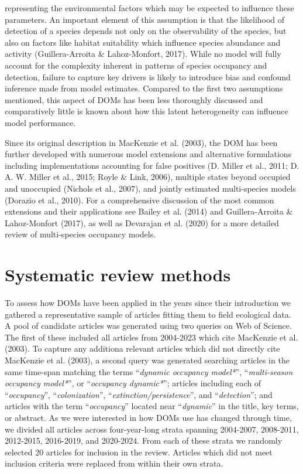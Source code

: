 \documentclass[
]{article}
\begin{document}
\begin{enumerate}
  representing the environmental factors which may be expected to
  influence these parameters. An important element of this assumption is
  that the likelihood of detection of a species depends not only on the
  observability of the species, but also on factors like habitat
  suitability which influence species abundance and activity
  (Guillera-Arroita \& Lahoz-Monfort, 2017). While no model will fully
  account for the complexity inherent in patterns of species occupancy
  and detection, failure to capture key drivers is likely to introduce
  bias and confound inference made from model estimates. Compared to the
  first two assumptions mentioned, this aspect of DOMs has been less
  thoroughly discussed and comparatively little is known about how this
  latent heterogeneity can influence model performance.
\end{enumerate}

Since its original description in MacKenzie et al. (2003), the DOM has
been further developed with numerous model extensions and alternative
formulations including implementations accounting for false positives
(D. Miller et al., 2011; D. A. W. Miller et al., 2015; Royle \& Link,
2006), multiple states beyond occupied and unoccupied (Nichols et al.,
2007), and jointly estimated multi-species models (Dorazio et al.,
2010). For a comprehensive discussion of the most common extensions and
their applications see Bailey et al. (2014) and Guillera-Arroita \&
Lahoz-Monfort (2017), as well as Devarajan et al. (2020) for a more
detailed review of multi-species occupancy models.

\section{Systematic review methods}\label{systematic-review-methods}

To assess how DOMs have been applied in the years since their
introduction we gathered a representative sample of articles fitting
them to field ecological data. A pool of candidate articles was
generated using two queries on Web of Science. The first of these
included all articles from 2004-2023 which cite MacKenzie et al. (2003).
To capture any additiona relevant articles which did not directly cite
MacKenzie et al. (2003), a second query was generated searching articles
in the same time-span matching the terms ``\emph{dynamic occupancy
model*}'', ``\emph{multi-season occupancy model*}'', or
``\emph{occupancy dynamic*}''; articles including each of
``\emph{occupancy}'', ``\emph{colonization}'',
``\emph{extinction/persistence}'', and ``\emph{detection}''; and
articles with the term ``\emph{occupancy}'' located near
``\emph{dynamic}'' in the title, key terms, or abstract. As we were
interested in how DOMs use has changed through time, we divided all
articles across four-year-long strata spanning 2004-2007, 2008-2011,
2012-2015, 2016-2019, and 2020-2024. From each of these strata we
randomly selected 20 articles for inclusion in the review. Articles
which did not meet inclusion criteria were replaced from within their
own strata.
\end{document}
